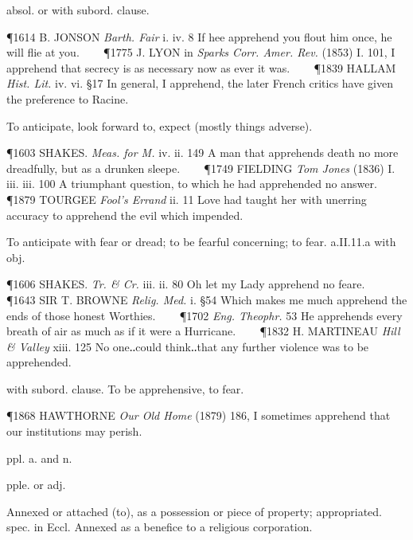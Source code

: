 \begin{description}[wide, labelwidth=!, labelindent=0pt]
\begin{myenumerate}
 absol. or with subord. clause.

\P 1614 B. JONSON  \textit{Barth. Fair} i. iv. 8 If hee apprehend you flout him once, he will flie at you.    
\P 1775 J. LYON  in \textit{Sparks Corr. Amer. Rev.} (1853) I. 101, I apprehend that secrecy is as necessary now as ever it was.    
\P 1839 HALLAM  \textit{Hist. Lit.} iv. vi. §17 In general, I apprehend, the later French critics have given the preference to Racine.

 To anticipate, look forward to, expect (mostly things adverse).

\P 1603 SHAKES.  \textit{Meas. for M.} iv. ii. 149 A man that apprehends death no more dreadfully, but as a drunken sleepe.    
\P 1749 FIELDING  \textit{Tom Jones} (1836) I. iii. iii. 100 A triumphant question, to which he had apprehended no answer.    
\P 1879 TOURGEE  \textit{Fool's Errand} ii. 11 Love had taught her with unerring accuracy to apprehend the evil which impended.

 To anticipate with fear or dread; to be fearful concerning; to fear. a.II.11.a with obj.

\P 1606 SHAKES.  \textit{Tr. \& Cr.} iii. ii. 80 Oh let my Lady apprehend no feare.    
\P 1643 SIR T. BROWNE  \textit{Relig. Med.} i. §54 Which makes me much apprehend the ends of those honest Worthies.    
\P 1702 \textit{Eng. Theophr.} 53 He apprehends every breath of air as much as if it were a Hurricane.    
\P 1832 H. MARTINEAU  \textit{Hill \& Valley} xiii. 125 No one‥could think‥that any further violence was to be apprehended.

 with subord. clause. To be apprehensive, to fear.

\P 1868 HAWTHORNE  \textit{Our Old Home} (1879) 186, I sometimes apprehend that our institutions may perish.
\end{myenumerate}


 ppl. a. and n.

\noindent {}

\vspace{-0.3cm}

\begin{myenumerate}

 pple. or adj.

 Annexed or attached (to), as a possession or piece of property; appropriated. spec. in Eccl. Annexed as a benefice to a religious corporation.


\end{myenumerate}
\end{description}
